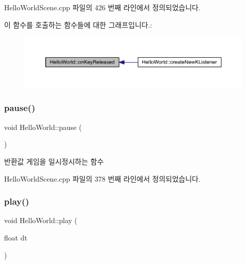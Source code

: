 Hello\+World\+Scene.\+cpp 파일의 426 번째 라인에서 정의되었습니다.

이 함수를 호출하는 함수들에 대한 그래프입니다.\+:
\nopagebreak
\begin{figure}[H]
\begin{center}
\leavevmode
\includegraphics[width=350pt]{class_hello_world_acb7b8934f4697e752182a650a1dc7c3a_icgraph}
\end{center}
\end{figure}
\mbox{\label{class_hello_world_af72bece97d2fe997936df92723636298}} 
\subsubsection{\texorpdfstring{pause()}{pause()}}
{\footnotesize\ttfamily void Hello\+World\+::pause (\begin{DoxyParamCaption}{ }\end{DoxyParamCaption})\hspace{0.3cm}{\ttfamily [protected]}}

\begin{DoxyReturn}{반환값}
게임을 일시정시하는 함수 
\end{DoxyReturn}


Hello\+World\+Scene.\+cpp 파일의 378 번째 라인에서 정의되었습니다.

\mbox{\label{class_hello_world_ac1aee383de0a7c30e84f7efc0da8d944}} 
\subsubsection{\texorpdfstring{play()}{play()}}
{\footnotesize\ttfamily void Hello\+World\+::play (\begin{DoxyParamCaption}\item[{float}]{dt }\end{DoxyParamCaption})\hspace{0.3cm}{\ttfamily [protected]}}



